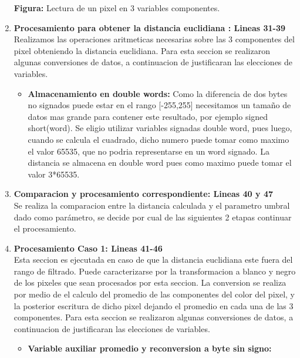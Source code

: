 \begin{enumerate}
        \par
        \bigskip
        \textbf{Figura:} Lectura de un pixel en 3 variables componentes.
    \item \textbf{Procesamiento para obtener la distancia euclidiana : Lineas 31-39}\\
      Realizamos las operaciones aritmeticas necesarias sobre las 3 componentes del pixel obteniendo la distancia euclidiana. Para esta seccion se realizaron algunas conversiones de datos, a continuacion de justificaran las elecciones de variables.
      \\
      \begin{itemize}
        \item \textbf{Almacenamiento en double words: }
        Como la diferencia de dos bytes no signados puede estar en el rango
        [-255,255] necesitamos un tamaño de datos mas grande para contener este
        resultado, por ejemplo signed short(word). Se eligio utilizar variables
        signadas double word, pues luego, cuando se calcula el cuadrado, dicho numero
        puede tomar como maximo el valor 65535, que no podria representarse en un word signado.
        La distancia se almacena en double word pues como maximo puede tomar el valor 3*65535.
      \end{itemize}
    \item \textbf{Comparacion y procesamiento correspondiente: Lineas 40 y 47}\\
      Se realiza la comparacion entre la distancia calculada y el parametro umbral dado como par\'ametro, se decide por cual de las siguientes 2 etapas continuar el procesamiento.
    \item \textbf{Procesamiento Caso 1: Lineas 41-46}\\
      Esta seccion es ejecutada en caso de que la distancia euclidiana este fuera del rango de filtrado. Puede caracterizarse por la transformacion a blanco y negro de los pixeles que sean procesados por esta seccion.
      La conversion se realiza por medio de el calculo del promedio de las componentes del color del pixel, y la posterior
      escritura de dicho pixel dejando el promedio en cada una de las 3 componentes.
      Para esta seccion se realizaron algunas conversiones de datos, a continuacion de justificaran las elecciones de variables.
      \\
      \begin{itemize}
        \item \textbf{Variable auxiliar promedio y reconversion a byte sin signo: }

\end{itemize}
\end{enumerate}
